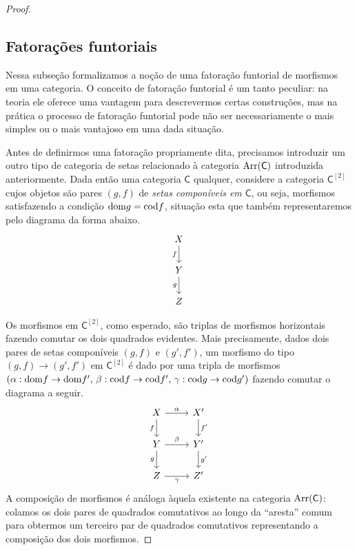 \begin{proof}
  \subsection{Fatorações funtoriais}

  Nessa subseção formalizamos a noção de uma fatoração funtorial de morfismos em uma categoria.
  O conceito de fatoração funtorial é um tanto peculiar: na teoria ele oferece uma vantagem para descrevermos certas construções, mas na prática o processo de fatoração funtorial pode não ser necessariamente o mais simples ou o mais vantajoso em uma dada situação.
  
  Antes de definirmos uma fatoração propriamente dita, precisamos introduzir um outro tipo de categoria de setas relacionado à categoria $\mathrm{Arr}(\mathsf{C})$ introduzida anteriormente.
  Dada então uma categoria $\mathsf{C}$ qualquer, considere a categoria $\mathsf{C}^{[2]}$ cujos objetos são pares $(g,f)$ de \emph{setas componíveis em $\mathsf{C}$}, ou seja, morfismos satisfazendo a condição $\mathrm{dom} g = \mathrm{cod} f$, situação esta que também representaremos pelo diagrama da forma abaixo.
  \begin{displaymath}
    \begin{tikzcd}
      X
      \arrow[d, "f" swap]
      \\ Y
      \arrow[d, "g" swap]
      \\ Z
    \end{tikzcd}
  \end{displaymath}
  
  Os morfismos em $\mathsf{C}^{[2]}$, como esperado, são triplas de morfismos horizontais fazendo comutar os dois quadrados evidentes.
  Mais precisamente, dados dois pares de setas componíveis $(g,f)$ e $(g',f')$, um morfismo do tipo $(g,f) \to (g',f')$ em $\mathsf{C}^{[2]}$ é dado por uma tripla de morfismos $(\alpha: \mathrm{dom} f \to \mathrm{dom} f',\, \beta: \mathrm{cod} f \to \mathrm{cod} f',\, \gamma: \mathrm{cod} g \to \mathrm{cod} g')$ fazendo comutar o diagrama a seguir.
  \begin{displaymath}
    \begin{tikzcd}
      X
      \arrow[r, "\alpha"]
      \arrow[d, "f" swap]
      & X'
      \arrow[d, "f'"]
      \\ Y
      \arrow[r, "\beta"]
      \arrow[d, "g" swap]
      & Y'
      \arrow[d, "g'"]
      \\ Z
      \arrow[r, "\gamma" swap]
      & Z'
    \end{tikzcd}
  \end{displaymath}
  A composição de morfismos é análoga àquela existente na categoria $\mathrm{Arr}(\mathsf{C})$: colamos os dois pares de quadrados comutativos ao longo da ``aresta'' comum para obtermos um terceiro par de quadrados comutativos representando a composição dos dois morfismos.
  

\end{proof}
